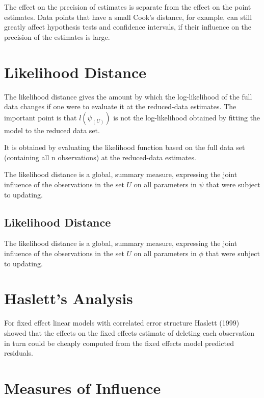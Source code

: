 \documentclass[12pt, a4paper]{report}
\theoremstyle{plain}
\theoremstyle{definition}
\theoremstyle{remark}
\begin{document}
The effect on the precision of estimates is separate from the effect on the point estimates. Data points that
have a small Cook's distance, for example, can still greatly affect hypothesis tests and confidence intervals, if their  influence on the precision of the estimates is large.


\newpage
\section{Likelihood Distance} %
The likelihood distance gives the amount by which the log-likelihood of the full data changes if one were
to evaluate it at the reduced-data estimates. The important point is that $l(\psi_{(U)})$ is not the log-likelihood
obtained by fitting the model to the reduced data set.

It is obtained by evaluating the likelihood function based on the full data set (containing all n observations) at the reduced-data estimates.

The likelihood distance is a global, summary measure, expressing the joint influence of the observations in
the set $U$ on all parameters in $\psi$  that were subject to updating.

\subsection{Likelihood Distance}

The  likelihood distance is a global, summary measure, expressing the joint influence of the observations in the set $U$ on all parameters in $\phi$  that were subject to updating.

\newpage
\section{Haslett's Analysis} %
For fixed effect linear models with correlated error structure Haslett (1999) showed that the effects on
the fixed effects estimate of deleting each observation in turn could be cheaply computed from the fixed effects model predicted residuals.

\newpage
\section{Measures of Influence} %
\end{document}
